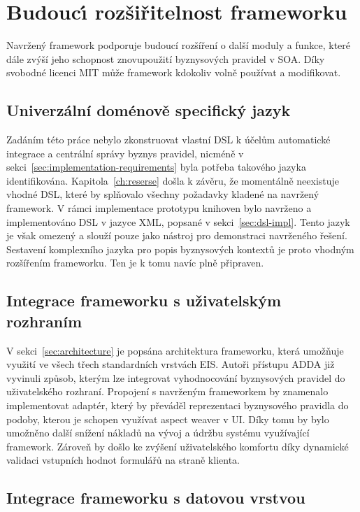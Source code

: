 \section{Budouc\'{\i} rozšiřitelnost frameworku}

Navržený framework podporuje budoucí rozšíření o další moduly a funkce, které
dále zvýší jeho schopnost znovupoužití byznysových pravidel v \gls{SOA}.
Díky svobodné licenci \gls{MIT} může framework kdokoliv volně používat a modifikovat.

\subsection{Univerzální doménově specifický jazyk}
Zadáním této práce nebylo zkonstruovat vlastní \gls{DSL}
k účelům automatické integrace a centrální správy byznys pravidel,
nicméně v sekci~\ref{sec:implementation-requirements} byla potřeba takového
jazyka identifikována. Kapitola~\ref{ch:reserse}
došla k závěru, že momentálně neexistuje vhodné \gls{DSL},
které by splňovalo všechny požadavky kladené na navržený framework.
V rámci implementace prototypu knihoven
bylo navrženo a implementováno \gls{DSL} v jazyce \gls{XML},
popsané v sekci~\ref{sec:dsl-impl}. Tento jazyk je však
omezený a slouží pouze jako nástroj pro demonstraci navrženého řešení.
Sestavení komplexního jazyka pro popis byznysových kontextů je proto vhodným
rozšířením frameworku. Ten je k tomu navíc plně připraven.

\subsection{Integrace frameworku s uživatelským rozhraním}

V sekci~\ref{sec:architecture} je popsána architektura frameworku, která umožňuje využití
ve všech třech standardních vrstvách \gls{EIS}. Autoři přístupu \gls{ADDA} již
vyvinuli způsob, kterým lze integrovat vyhodnocování byznysových pravidel do uživatelského
rozhraní. Propojení s navrženým frameworkem by znamenalo implementovat adaptér, který by převáděl
reprezentaci byznysového pravidla do podoby, kterou je schopen využívat aspect weaver v \gls{UI}.
Díky tomu by bylo umožněno další snížení nákladů na vývoj a údržbu systému využívající framework.
Zároveň by došlo ke zvýšení uživatelského komfortu díky dynamické validaci vstupních hodnot formulářů
na straně klienta.

\subsection{Integrace frameworku s datovou vrstvou}

